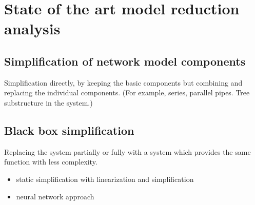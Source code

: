 \section{State of the art model reduction analysis}
\label{state_of_the_art_model_reduction_analysis}


\subsection{Simplification of network model components}
\label{simplification of network model components}

Simplification directly, by keeping the basic components but combining and replacing the individual components. (For example, series, parallel pipes. Tree substructure in the system.)

\subsection{Black box simplification}
\label{black_box_simplification}

Replacing the system partially or fully with a system which provides the same function with less complexity. 

\begin{itemize}
  \item static simplification with linearization and simplification
  \item neural network approach 
\end{itemize}
























